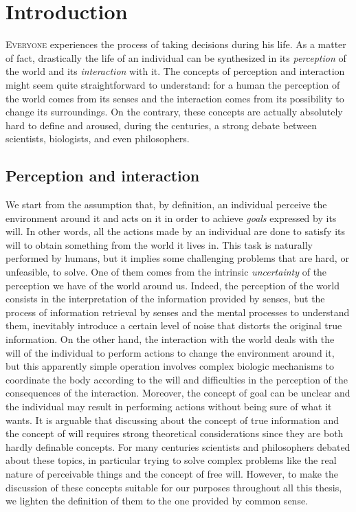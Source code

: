\chapter{Introduction}
\lettrine{E}{veryone} experiences the process of taking decisions during his life. As a matter of fact, drastically the life of an individual can be synthesized in its \textit{perception} of the world and its \textit{interaction} with it. The concepts of perception and interaction might seem quite straightforward to understand: for a human the perception of the world comes from its senses and the interaction comes from its possibility to change its surroundings. On the contrary, these concepts are actually absolutely hard to define and aroused, during the centuries, a strong debate between scientists, biologists, and even philosophers.

\section{Perception and interaction}
We start from the assumption that, by definition, an individual perceive the environment around it and acts on it in order to achieve \textit{goals} expressed by its will. In other words, all the actions made by an individual are done to satisfy its will to obtain something from the world it lives in. This task is naturally performed by humans, but it implies some challenging problems that are hard, or unfeasible, to solve. One of them comes from the intrinsic \textit{uncertainty} of the perception we have of the world around us. Indeed, the perception of the world consists in the interpretation of the information provided by senses, but the process of information retrieval by senses and the mental processes to understand them, inevitably introduce a certain level of noise that distorts the original true information. On the other hand, the interaction with the world deals with the will of the individual to perform actions to change the environment around it, but this apparently simple operation involves complex biologic mechanisms to coordinate the body according to the will and difficulties in the perception of the consequences of the interaction. Moreover, the concept of goal can be unclear and the individual may result in performing actions without being sure of what it wants.
It is arguable that discussing about the concept of true information and the concept of will requires strong theoretical considerations since they are both hardly definable concepts. For many centuries scientists and philosophers debated about these topics, in particular trying to solve complex problems like the real nature of perceivable things and the concept of free will. However, to make the discussion of these concepts suitable for our purposes throughout all this thesis, we lighten the definition of them to the one provided by common sense.

